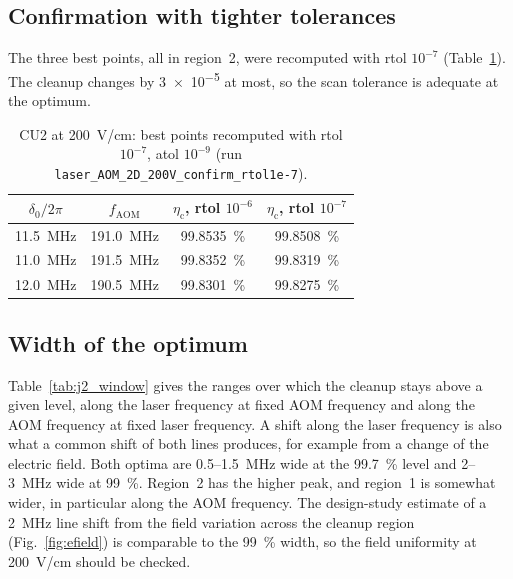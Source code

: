 \documentclass[11pt,a4paper,oneside]{report}
\newcommand{\code}[1]{\texttt{#1}}
\newcommand{\etac}{\eta_{\mathrm{c}}}
\newcommand{\fAOM}{f_{\mathrm{AOM}}}
\begin{document}
\subsection{Confirmation with tighter tolerances}

The three best points, all in region~2, were recomputed with rtol $10^{-7}$
(Table~\ref{tab:j2_confirm}). The cleanup changes by \num{3e-5} at most, so the scan
tolerance is adequate at the optimum.

\begin{table}[htbp]
  \centering
  \caption[CU2 at \SI{200}{V/cm}: confirmation of the best points]{CU2 at \SI{200}{V/cm}:
  best points recomputed with rtol $10^{-7}$, atol $10^{-9}$ (run
  \code{laser\_AOM\_2D\_200V\_confirm\_rtol1e-7}).}
  \label{tab:j2_confirm}
  \small
  \begin{tabular}{cccc}
    \toprule
    $\delta_0/2\pi$ & $\fAOM$ & $\etac$, rtol $10^{-6}$ & $\etac$, rtol $10^{-7}$ \\
    \midrule
    \SI{11.5}{MHz} & \SI{191.0}{MHz} & \SI{99.8535}{\percent} & \SI{99.8508}{\percent} \\
    \SI{11.0}{MHz} & \SI{191.5}{MHz} & \SI{99.8352}{\percent} & \SI{99.8319}{\percent} \\
    \SI{12.0}{MHz} & \SI{190.5}{MHz} & \SI{99.8301}{\percent} & \SI{99.8275}{\percent} \\
    \bottomrule
  \end{tabular}
\end{table}

\subsection{Width of the optimum}

Table~\ref{tab:j2_window} gives the ranges over which the cleanup stays above a given level,
along the laser frequency at fixed AOM frequency and along the AOM frequency at fixed laser
frequency. A shift along the laser frequency is also what a common shift of both lines
produces, for example from a change of the electric field. Both optima are 0.5--\SI{1.5}{MHz}
wide at the \SI{99.7}{\percent} level and 2--\SI{3}{MHz} wide at \SI{99}{\percent}.
Region~2 has the higher peak, and region~1 is somewhat wider, in particular along the AOM
frequency. The design-study estimate of a \SI{2}{MHz} line shift from the field variation
across the cleanup region (Fig.~\ref{fig:efield}) is comparable to the \SI{99}{\percent} width,
so the field uniformity at \SI{200}{V/cm} should be checked.
\end{document}
